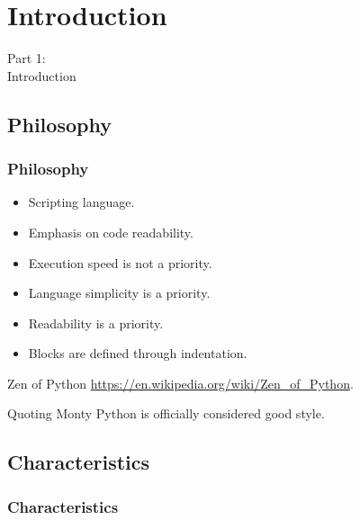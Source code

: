 {
\renewcommand{\bgcolor}{intro}

\section{Introduction}
\begin{frame}
    \vspace{25mm}
    \begin{center}
        \Huge{Part 1:\\Introduction}
    \end{center}
\end{frame}

\subsection{Philosophy}
\begin{frame}
    \frametitle{Philosophy}
    \vspace{5mm}
    \begin{itemize}
      \item Scripting language.
      \item Emphasis on code readability.
      \item Execution speed is not a priority.
      \item Language simplicity is a priority.
      \item Readability is a priority.
      \item Blocks are defined through indentation.
    \end{itemize}
    
    \pause
    \vspace{5mm}
    Zen of Python \url{https://en.wikipedia.org/wiki/Zen\_of\_Python}.
    
    \pause
    \vspace{5mm}
    Quoting Monty Python is officially considered good style.
\end{frame}

\subsection{Characteristics}
\begin{frame}
    \frametitle{Characteristics}
    \vspace{5mm}
    

\end{frame}}
